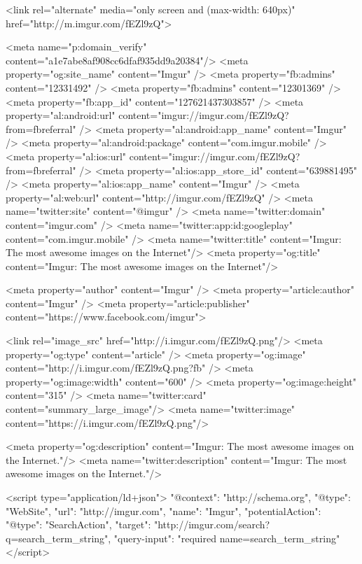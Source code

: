                 <link rel="alternate" media="only screen and (max-width: 640px)" href="http://m.imgur.com/fEZl9zQ">
    

    <meta name="p:domain_verify" content="a1e7abe8af908cc6dfaf935dd9a20384"/>
    <meta property="og:site_name" content="Imgur" />
    <meta property="fb:admins" content="12331492" />
    <meta property="fb:admins" content="12301369" />
    <meta property="fb:app_id" content="127621437303857" />
    <meta property="al:android:url" content="imgur://imgur.com/fEZl9zQ?from=fbreferral" />
    <meta property="al:android:app_name" content="Imgur" />
    <meta property="al:android:package" content="com.imgur.mobile" />
    <meta property="al:ios:url" content="imgur://imgur.com/fEZl9zQ?from=fbreferral" />
    <meta property="al:ios:app_store_id" content="639881495" />
    <meta property="al:ios:app_name" content="Imgur" />
    <meta property="al:web:url" content="http://imgur.com/fEZl9zQ" />
    <meta name="twitter:site" content="@imgur" />
    <meta name="twitter:domain" content="imgur.com" />
    <meta name="twitter:app:id:googleplay" content="com.imgur.mobile" />
                <meta name="twitter:title" content="Imgur: The most awesome images on the Internet"/>
        <meta property="og:title" content="Imgur: The most awesome images on the Internet"/>
    

    <meta property="author" content="Imgur" />
    <meta property="article:author" content="Imgur" />
    <meta property="article:publisher" content="https://www.facebook.com/imgur">

    

                        <link rel="image_src"            href="http://i.imgur.com/fEZl9zQ.png"/>
            <meta property="og:type"         content="article" />
            <meta property="og:image"        content="http://i.imgur.com/fEZl9zQ.png?fb" />
            <meta property="og:image:width"  content="600" />
            <meta property="og:image:height" content="315" />
            <meta name="twitter:card"        content="summary_large_image"/>
            <meta name="twitter:image"       content="https://i.imgur.com/fEZl9zQ.png"/>
        
    

            <meta property="og:description" content="Imgur: The most awesome images on the Internet."/>
        <meta name="twitter:description" content="Imgur: The most awesome images on the Internet."/>
    

    
    <script type="application/ld+json">
        {
            "@context": "http://schema.org",
            "@type": "WebSite",
            "url": "http://imgur.com",
            "name": "Imgur",
            "potentialAction": {
                "@type": "SearchAction",
                "target": "http://imgur.com/search?q={search_term_string}",
                "query-input": "required name=search_term_string"
            }
        }
    </script>
    

